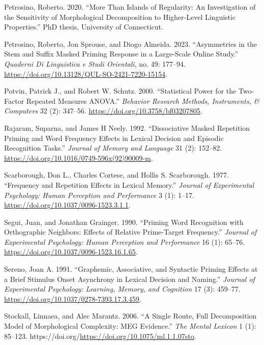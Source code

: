 \documentclass[
]{interact}
\newlength{\cslhangindent}
\newenvironment{CSLReferences}[2] %
 {\begin{list}{}{%
  \setlength{\itemindent}{0pt}
  \setlength{\leftmargin}{0pt}
  \setlength{\parsep}{0pt}
  \ifodd #1
   \setlength{\leftmargin}{\cslhangindent}
   \setlength{\itemindent}{-1\cslhangindent}
  \fi
  \setlength{\itemsep}{#2\baselineskip}}}
 {\end{list}}
\begin{document}
\begin{CSLReferences}{1}{0}
Petrosino, Roberto. 2020. {``More Than Islands of Regularity: An
Investigation of the Sensitivity of Morphological Decomposition to
Higher-Level Linguistic Properties.''} PhD thesis, University of
Connecticut.

Petrosino, Roberto, Jon Sprouse, and Diogo Almeida. 2023. {``Asymmetries
in the Stem and Suffix Masked Priming Response in a Large-Scale Online
Study.''} \emph{Quaderni Di Linguistica e Studi Orientali}, no. 49:
177--94. \url{https://doi.org/10.13128/QUL-SO-2421-7220-15154}.

Potvin, Patrick J., and Robert W. Schutz. 2000. {``Statistical Power for
the Two-Factor Repeated Measures ANOVA.''} \emph{Behavior Research
Methods, Instruments, \& Computers} 32 (2): 347--56.
\url{https://doi.org/10.3758/bf03207805}.

Rajaram, Suparna, and James H Neely. 1992. {``Dissociative Masked
Repetition Priming and Word Frequency Effects in Lexical Decision and
Episodic Recognition Tasks.''} \emph{Journal of Memory and Language} 31
(2): 152--82. \url{https://doi.org/10.1016/0749-596x(92)90009-m}.

Scarborough, Don L., Charles Cortese, and Hollis S. Scarborough. 1977.
{``Frequency and Repetition Effects in Lexical Memory.''} \emph{Journal
of Experimental Psychology: Human Perception and Performance} 3 (1):
1--17. \url{https://doi.org/10.1037/0096-1523.3.1.1}.

Segui, Juan, and Jonathan Grainger. 1990. {``Priming Word Recognition
with Orthographic Neighbors: Effects of Relative Prime-Target
Frequency.''} \emph{Journal of Experimental Psychology: Human Perception
and Performance} 16 (1): 65--76.
\url{https://doi.org/10.1037/0096-1523.16.1.65}.

Sereno, Joan A. 1991. {``Graphemic, Associative, and Syntactic Priming
Effects at a Brief Stimulus Onset Asynchrony in Lexical Decision and
Naming.''} \emph{Journal of Experimental Psychology: Learning, Memory,
and Cognition} 17 (3): 459--77.
\url{https://doi.org/10.1037/0278-7393.17.3.459}.

Stockall, Linnaea, and Alec Marantz. 2006. {``A Single Route, Full
Decomposition Model of Morphological Complexity: MEG Evidence.''}
\emph{The Mental Lexicon} 1 (1): 85--123.
https://doi.org/\url{https://doi.org/10.1075/ml.1.1.07sto}.


\end{CSLReferences}
\end{document}
